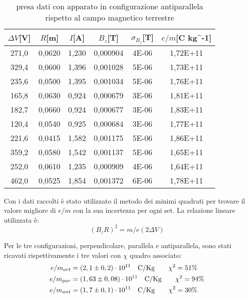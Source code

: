 \documentclass{article}
\begin{document}
    \begin{table}[H]
        
            \centering
            \begin{tabular}{ cccccc } 
            \toprule 
            $\Delta V$[V] & $R$[m] & $I$[A] & $B_z$[T] & $\sigma_{B_z}$[T] & $e/m$[C kg^{-1}] \\
            \midrule 
            271,0	&	0,0620	&	1,230	&	0,000904	&	4E-06	&	1,72E+11    \\
            329,4	&	0,0600	&	1,396	&	0,001028	&	5E-06	&	1,73E+11    \\
            235,6	&	0,0500	&	1,395	&	0,001034	&	5E-06	&	1,76E+11    \\
            165,8	&	0,0630	&	0,924	&	0,000679	&	3E-06	&	1,81E+11    \\
            182,7	&	0,0660	&	0,924	&	0,000677	&	3E-06	&	1,83E+11    \\
            120,4	&	0,0540	&	0,925	&	0,000684	&	3E-06	&	1,77E+11    \\
            221,6	&	0,0415	&	1,582	&	0,001175	&	5E-06	&	1,86E+11    \\
            359,2	&	0,0580	&	1,542	&	0,001137	&	5E-06	&	1,65E+11    \\
            252,0	&	0,0610	&	1,235	&	0,000909	&	4E-06	&	1,64E+11    \\
            462,0	&	0,0525	&	1,854	&	0,001372	&	6E-06	&	1,78E+11    \\
            \bottomrule           
        \end{tabular}
        \caption{presa dati con apparato in configurazione antiparallela rispetto al campo magnetico terrestre}
        \label{misure antiparalleli}
    \end{table}
    
    Con i dati raccolti è stato utilizzato il metodo dei minimi quadrati per trovare il valore migliore di $e/m$ con la sua incertezza per ogni set. La relazione lineare utilizzata è:
    \begin{equation}\label{Relazione lineare}
        (B_z R)^2 = m/e (2\Delta V) 
    \end{equation}
        
    Per le tre configurazioni, perpendicolare, parallela e antiparallela, sono stati ricavati rispettivamente i tre valori con $\chi$ quadro associato:
    \begin{align*}
        e/m_{ort} &= (2,1 \pm 0,2)\cdot 10^{11} \qq{C/Kg} \quad \chi^2 = 51\% \\
        e/m_{par} &= (1,63 \pm 0,08) \cdot 10^{11} \qq{C/Kg} \quad \chi^2 = 94\% \\
        e/m_{ant} &= (1,7 \pm 0,1) \cdot 10^{11}  \qq{C/Kg} \quad \chi^2 = 30\%
    \end{align*}
\end{document}
